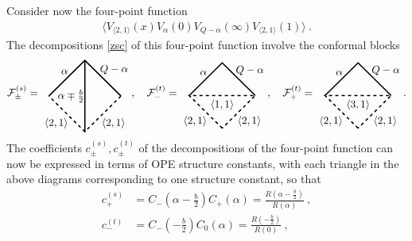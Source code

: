 \documentclass[12pt, a4paper, notitlepage, twoside]{report}
\numberwithin{equation}{section}
\theoremstyle{break}
\begin{document}
Consider now the four-point function
\begin{align}
 \Big\langle V_{\langle 2,1 \rangle}(x) V_\alpha(0) V_{Q-\alpha}(\infty) V_{\langle 2,1 \rangle}(1)\Big\rangle\ .
\label{zvv}
\end{align}
The decompositions \eqref{zsc} of this four-point function involve the conformal blocks
 \begin{align}
\mathcal{F}^{(s)}_\pm = 
\begin{tikzpicture}[baseline=(current  bounding  box.center), very thick, scale = .6]
\draw[dashed] (2, 0) -- node [below right] {\!\!\!$\langle 2,1 \rangle$} (0, -2) -- node [below left] {$\langle 2,1 \rangle$\!\!\!} (-2, 0); 
\draw (-2, 0) -- node [above left] {$\alpha$\!\!\!} (0, 2) -- node [above right] {\!\!\!\!$Q-\alpha$} (2, 0);
\draw (0, -2) -- node [left] {$\alpha\mp \frac{b}{2}\! \! $} (0, 2); 
\end{tikzpicture}
, \quad
 \mathcal{F}^{(t)}_-  =  
 \begin{tikzpicture}[baseline=(current  bounding  box.center), very thick, scale = .55]
\draw (-2, 0) -- node [above left] {$\alpha$\!\!\!} (0, 2) -- node [above right] {\!\!\!\!$Q-\alpha$} (2, 0);
\draw[dashed] (0, -2) -- node [below left] {$\langle 2,1 \rangle$\!\!\!} (-2, 0) -- node [below] {$\langle 1,1 \rangle$} (2, 0) -- node [below right] {\!\!\!$\langle 2,1 \rangle$} (0, -2); 
\end{tikzpicture}
, \quad
 \mathcal{F}^{(t)}_+  =  
 \begin{tikzpicture}[baseline=(current  bounding  box.center), very thick, scale = .55]
\draw (-2, 0) -- node [above left] {$\alpha$\!\!\!} (0, 2) -- node [above right] {\!\!\!\!$Q-\alpha$} (2, 0);
\draw[dashed] (0, -2) -- node [below left] {$\langle 2,1 \rangle$\!\!\!} (-2, 0) -- node [below] {$\langle 3,1 \rangle$} (2, 0) -- node [below right] {\!\!\!$\langle 2,1 \rangle$} (0, -2); 
\end{tikzpicture}
.
\end{align}
The coefficients $c^{(s)}_\pm,c^{(t)}_\pm$ of the decompositions of the four-point function can now be expressed in terms of OPE structure constants, with each triangle in the above diagrams corresponding to one structure constant, so that 
\begin{align}
 c^{(s)}_+ &= C_-(\alpha-\tfrac{b}{2})C_+(\alpha) = \frac{R(\alpha-\tfrac{b}{2})}{R(\alpha)}\ ,
\\
c^{(t)}_- & = C_-(-\tfrac{b}{2}) C_0(\alpha)= \frac{R(-\tfrac{b}{2})}{R(0)}\ ,
\end{align}
\end{document}
